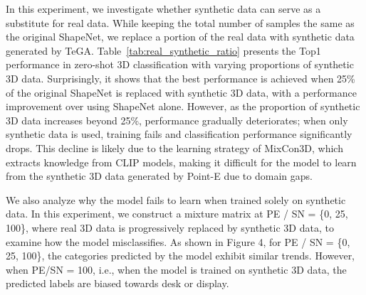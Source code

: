  In this experiment, we investigate whether synthetic data can serve as a substitute for real data. While keeping the total number of samples the same as the original ShapeNet, we replace a portion of the real data with synthetic data generated by TeGA.
Table~\ref{tab:real_synthetic_ratio} presents the Top1 performance in zero-shot 3D classification with varying proportions of synthetic 3D data. Surprisingly, it shows that the best performance is achieved when 25\% of the original ShapeNet is replaced with synthetic 3D data, with a performance improvement over using ShapeNet alone. However, as the proportion of synthetic 3D data increases beyond 25\%, performance gradually deteriorates; when only synthetic data is used, training fails and classification performance significantly drops. This decline is likely due to the learning strategy of MixCon3D, which extracts knowledge from CLIP models, making it difficult for the model to learn from the synthetic 3D data generated by Point-E due to domain gaps.

We also analyze why the model fails to learn when trained solely on synthetic data. In this experiment, we construct a mixture matrix at PE / SN = \{0, 25, 100\}, where real 3D data is progressively replaced by synthetic 3D data, to examine how the model misclassifies. As shown in Figure 4, for PE / SN = \{0, 25, 100\}, the categories predicted by the model exhibit similar trends. However, when PE/SN = 100, i.e., when the model is trained on synthetic 3D data, the predicted labels are biased towards desk or display.



